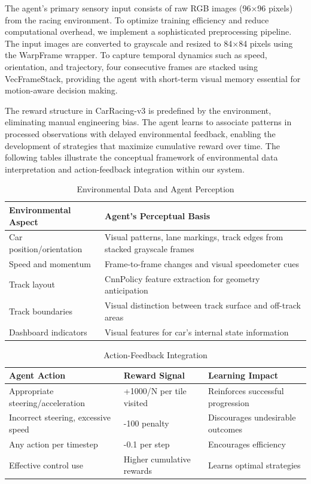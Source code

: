 The agent's primary sensory input consists of raw RGB images (96×96 pixels) from the racing environment. To optimize training efficiency and reduce computational overhead, we implement a sophisticated preprocessing pipeline. The input images are converted to grayscale and resized to 84×84 pixels using the WarpFrame wrapper. To capture temporal dynamics such as speed, orientation, and trajectory, four consecutive frames are stacked using VecFrameStack, providing the agent with short-term visual memory essential for motion-aware decision making.

The reward structure in CarRacing-v3 is predefined by the environment, eliminating manual engineering bias. The agent learns to associate patterns in processed observations with delayed environmental feedback, enabling the development of strategies that maximize cumulative reward over time. The following tables illustrate the conceptual framework of environmental data interpretation and action-feedback integration within our system.

\begin{table}[h!]
\caption{Environmental Data and Agent Perception}
\label{tab:env_perception_en}
\centering
\footnotesize
\begin{tabular}{|p{2.8cm}|p{4.5cm}|}
\hline
\textbf{Environmental Aspect} & \textbf{Agent's Perceptual Basis} \\
\hline
Car position/orientation & Visual patterns, lane markings, track edges from stacked grayscale frames \\
\hline
Speed and momentum & Frame-to-frame changes and visual speedometer cues \\
\hline
Track layout & CnnPolicy feature extraction for geometry anticipation \\
\hline
Track boundaries & Visual distinction between track surface and off-track areas \\
\hline
Dashboard indicators & Visual features for car's internal state information \\
\hline
\end{tabular}
\end{table}

\begin{table}[h!]
\caption{Action-Feedback Integration}
\label{tab:reward_integration_en}
\centering
\footnotesize
\begin{tabular}{|p{2.2cm}|p{2.3cm}|p{2.8cm}|}
\hline
\textbf{Agent Action} & \textbf{Reward Signal} & \textbf{Learning Impact} \\
\hline
Appropriate steering/acceleration & +1000/N per tile visited & Reinforces successful progression \\
\hline
Incorrect steering, excessive speed & -100 penalty & Discourages undesirable outcomes \\
\hline
Any action per timestep & -0.1 per step & Encourages efficiency \\
\hline
Effective control use & Higher cumulative rewards & Learns optimal strategies \\
\hline
\end{tabular}
\end{table}

